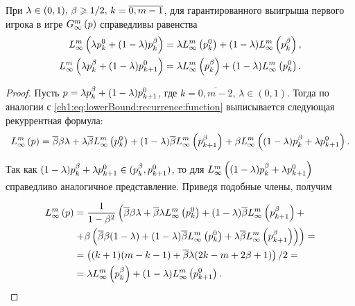 {\begin{proposition}
  \label{ch1:prop:first:combination:game}
  При $\lambda \in (0, 1), \, \Co \geq 1/2, \, k = \overline{0, m-1}$,
  для гарантированного выигрыша первого игрока в игре $\infiniteGame{p}$
  справедливы равенства
  \begin{align*}
    \lowerBound{\lambda \pEven + (1-\lambda) \pOdd}      
    &= 
      \lambda \lowerBound{\pEven} + (1-\lambda) \lowerBound{\pOdd}, \\
    \lowerBound{\lambda \pOdd + (1-\lambda) \pEven[k+1]} 
    &= \lambda \lowerBound{\pOdd} + (1-\lambda) \lowerBound{\pEven}.
  \end{align*}
\end{proposition}
\begin{proof}
  Пусть $p = \lambda \pOdd + (1-\lambda) \pEven[k+1]$, где %
  $k = \overline{0, m - 2}, \, \lambda \in (0, 1)$. Тогда по аналогии с
  \eqref{ch1:eq:lowerBound:recurrence:function} выписывается следующая рекуррентная
  формула:
  \begin{equation*}
    \lowerBound{p} = \DCo \Co \lambda + \lambda \DCo
    \lowerBound{\pEven} + (1-\lambda) \DCo \lowerBound{\pOdd[k+1]} +
    \Co \lowerBound{(1-\lambda) \pOdd + \lambda \pEven[k+1]}.
  \end{equation*}
  
  Так как %
  $(1-\lambda)\pOdd + \lambda \pEven[k+1] \in (\pOdd, \pEven[k+1])$, то для
  $\lowerBound{(1-\lambda)\pOdd + \lambda \pEven[k+1]}$ справедливо аналогичное
  представление. Приведя подобные члены, получим

  \begin{equation}
    \label{ch1:eq:first:combination:game:2}
    \begin{aligned}
      \lowerBound{p} 
      &= 
      \frac{1}{1-\Co^2}
      \left(
        \DCo\Co\lambda + 
        \DCo\lambda\lowerBound{\pEven} + 
        (1-\lambda)\DCo\lowerBound{\pOdd[k+1]} + 
      \right.\\
      &\left. 
        + \Co \left( 
          \DCo\Co(1-\lambda) +
          (1-\lambda)\DCo\lowerBound{\pEven} +
          \lambda\DCo\lowerBound{\pOdd[k+1]} 
        \right)
      \right) = \\
      &=
      \left( (k + 1)(m - k - 1) + \DCo\lambda(2k - m + 2\Co + 1)
      \right)/2 = \\
      &=
      \lambda\lowerBound{\pOdd} + (1-\lambda)\lowerBound{\pEven[k+1]}.
    \end{aligned}
  \end{equation}
  

\end{proof}}
